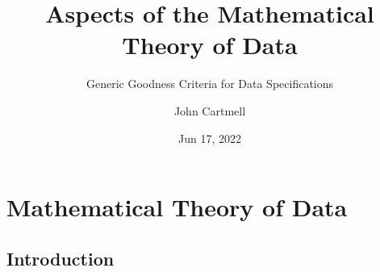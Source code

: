 

\usepackage{mathptmx}
\usepackage{amsfonts}
\usepackage{wasysym}
\usepackage{url}
\usepackage{hyperref}


\newcommand{\sharedmacros}{../../SharedMacros}










\renewcommand{\erpictureFolder}[0]{../../SharedPictures}
\setcounter{equation}{0}



\title[John Cartmell]{Aspects of the Mathematical Theory of Data}
\subtitle{Generic Goodness Criteria for Data Specifications}
\author{John Cartmell}
\date{Jun 17, 2022}

\usepackage{framed}
\usepackage{bibentry}
\usepackage{colortbl}
\usepackage{ulem}   %
\usepackage{listings}
\usepackage{arydshln} %
\usepackage{pst-arrow} %

\nobibliography*



\begin{frame}
\titlepage
\end{frame}

\section{Mathematical Theory of Data}

\subsection{Introduction}


